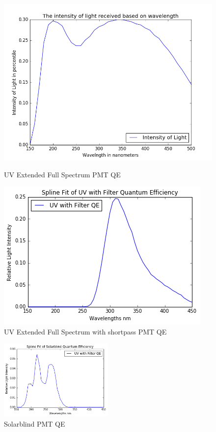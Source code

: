 \documentclass{article}
\begin{document}
\begin{figure}[H]
  \centering
  \begin{minipage}[b]{0.4\textwidth}
    \includegraphics[width=\textwidth]{UVQE.png}
    \caption{UV Extended Full Spectrum PMT QE}
  \end{minipage}
  \hfill
  \begin{minipage}[b]{0.4\textwidth}
    \includegraphics[width=\textwidth]{FilQE.png}
    \caption{UV Extended Full Spectrum with shortpass PMT QE}
  \end{minipage}
\end{figure}

\begin{figure}
  \centering
    \includegraphics[width=0.5\textwidth]{SBQE.png}
  \caption{Solarblind PMT QE}
  \label{fig:workflowedge}
\end{figure}


\end{document}
